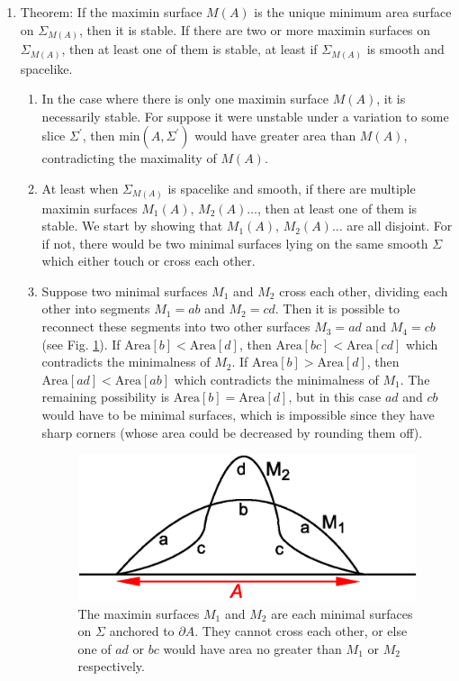 \documentclass[12pt]{article}
\begin{document}
\begin{enumerate}[resume]
\item \label{sta} Theorem: If the maximin surface $M(A)$ is the unique minimum area surface on $\Sigma_{M(A)}$, then it is stable. If there are two or more maximin surfaces on $\Sigma_{M(A)}$, then at least one of them is stable, at least if $\Sigma_{M(A)}$ is smooth and spacelike.
	\begin{enumerate}
	\item In the case where there is only one maximin surface $M(A)$, it is necessarily stable.  For suppose it were unstable under a variation to some slice $\Sigma^\prime$, then $\mathrm{min}(A,\Sigma^\prime)$ would have greater area than $M(A)$, contradicting the maximality of $M(A)$.
	\item At least when $\Sigma_{M(A)}$ is spacelike and smooth, if there are multiple maximin surfaces $M_1(A),\,M_2(A)\ldots$, then at least one of them is stable.  We start by showing that $M_1(A),\,M_2(A)\ldots$ are all disjoint.  For if not, there would be two minimal surfaces lying on the same smooth $\Sigma$ which either touch or cross each other.  
	\item Suppose two minimal surfaces $M_1$ and $M_2$ cross each other, dividing each other into segments $M_1 = ab$ and $M_2 = cd$.  Then it is possible to reconnect these segments into two other surfaces $M_3 = ad$ and $M_4 = cb$ (see Fig. \ref{squiggle}).  If $\mathrm{Area}[b] < \mathrm{Area}[d]$, then $\mathrm{Area}[bc] < \mathrm{Area}[cd]$ which contradicts the minimalness of $M_2$.  If $\mathrm{Area}[b] > \mathrm{Area}[d]$, then $\mathrm{Area}[ad] < \mathrm{Area}[ab]$ which contradicts the minimalness of $M_1$.  The remaining possibility is $\mathrm{Area}[b] = \mathrm{Area}[d]$, but in this case $ad$ and $cb$ would have to be minimal surfaces, which is impossible since they have sharp corners (whose area could be decreased by rounding them off).
\begin{figure}[hbt]
\centering
\includegraphics[width=.5\textwidth]{squiggle.eps}
\caption{\footnotesize The maximin surfaces $M_1$ and $M_2$ are each minimal surfaces on $\Sigma$ anchored to $\partial A$.  They cannot cross each other, or else one of $ad$ or $bc$ would have area no greater than $M_1$ or $M_2$ respectively.}\label{squiggle}

\end{figure}
\end{enumerate}
\end{enumerate}
\end{document}
